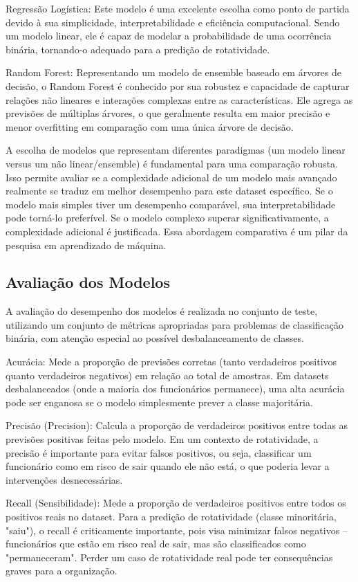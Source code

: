 \documentclass[sigconf]{acmart}
\begin{document}
Regressão Logística: Este modelo é uma excelente escolha como ponto de partida devido à sua simplicidade, interpretabilidade e eficiência computacional. Sendo um modelo linear, ele é capaz de modelar a probabilidade de uma ocorrência binária, tornando-o adequado para a predição de rotatividade.

Random Forest: Representando um modelo de ensemble baseado em árvores de decisão, o Random Forest é conhecido por sua robustez e capacidade de capturar relações não lineares e interações complexas entre as características. Ele agrega as previsões de múltiplas árvores, o que geralmente resulta em maior precisão e menor overfitting em comparação com uma única árvore de decisão.

A escolha de modelos que representam diferentes paradigmas (um modelo linear versus um não linear/ensemble) é fundamental para uma comparação robusta. Isso permite avaliar se a complexidade adicional de um modelo mais avançado realmente se traduz em melhor desempenho para este dataset específico. Se o modelo mais simples tiver um desempenho comparável, sua interpretabilidade pode torná-lo preferível. Se o modelo complexo superar significativamente, a complexidade adicional é justificada. Essa abordagem comparativa é um pilar da pesquisa em aprendizado de máquina.

\subsection{Avaliação dos Modelos}
A avaliação do desempenho dos modelos é realizada no conjunto de teste, utilizando um conjunto de métricas apropriadas para problemas de classificação binária, com atenção especial ao possível desbalanceamento de classes.

Acurácia: Mede a proporção de previsões corretas (tanto verdadeiros positivos quanto verdadeiros negativos) em relação ao total de amostras. Em datasets desbalanceados (onde a maioria dos funcionários permanece), uma alta acurácia pode ser enganosa se o modelo simplesmente prever a classe majoritária.

Precisão (Precision): Calcula a proporção de verdadeiros positivos entre todas as previsões positivas feitas pelo modelo. Em um contexto de rotatividade, a precisão é importante para evitar falsos positivos, ou seja, classificar um funcionário como em risco de sair quando ele não está, o que poderia levar a intervenções desnecessárias.

Recall (Sensibilidade): Mede a proporção de verdadeiros positivos entre todos os positivos reais no dataset. Para a predição de rotatividade (classe minoritária, "saiu"), o recall é criticamente importante, pois visa minimizar falsos negativos – funcionários que estão em risco real de sair, mas são classificados como "permaneceram". Perder um caso de rotatividade real pode ter consequências graves para a organização.
\end{document}
